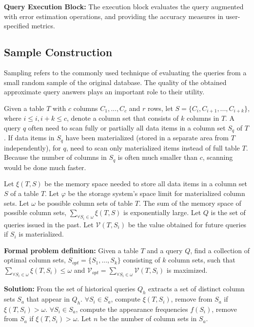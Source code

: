 \documentclass{sig-alternate-05-2015}
\begin{document}
\noindent
\textbf{Query Execution Block:} 
The execution block evaluates the query augmented with error estimation operations, and providing the accuracy measures in user-specified metrics. 

\subsection{Sample Construction}
Sampling refers to the commonly used technique of evaluating the queries from a small random sample of the original database. The quality of the obtained approximate query answers plays an important role to their utility.

Given a table $T$ with $c$ columns $C_1, ..., C_c$ and $r$ rows, let $S=\{C_i, C_{i+1}, ..., C_{i+k}\}$, where $ i \leq i, i+k \leq c$, denote a column set that consists of $k$ columns in $T$. A query $q$ often need to scan fully or partially all data items in a column set $S_q$ of $T$. If data items in $S_q$ have been materialized (stored in a separate area from $T$ independently), for $q$, need to scan only materialized items instead of full table $T$. Because the number of columns in $S_q$ is often much smaller than $c$, scanning would be done much faster.

Let $\xi(T, S)$ be the memory space needed to store all data items in a column set $S$ of a table $T$.
Let $\varphi$ be the storage system's space limit for materialized column sets.
Let $\omega$ be possible column sets of table $T$. 
The sum of the memory space of possible column sets, $\sum_{\forall S_i \in \omega} \xi(T, S)$ is exponentially large.
Let $Q$ is the set of queries issued in the past.
Let $\mathcal{V}(T, S_i)$ be the value obtained for future queries if $S_i$ is materialized.

\noindent
\textbf{Formal problem definition:}  Given a table $T$ and a query $Q$, find a collection of optimal column sets, $S_{opt} = \{S_1, ..., S_k\}$ consisting of $k$ column sets, such that $\sum_{\forall S_i \in \omega} \xi(T, S_i) \leq \omega $ and $\mathcal{V}_{opt} = \sum_{\forall S_i \in \omega} \mathcal{V}(T, S_i) $ is maximized.

\noindent
\textbf{Solution:}
From the set of historical queries $Q_h$ extracts a set of distinct column sets $S_{a}$ that appear in $Q_h$.
$\forall S_i \in S_{a}$, compute $\xi(T, S_i)$, remove from $S_{a}$ if $\xi(T, S_i) > \omega$.
$\forall S_i \in S_{a}$, compute the appearance frequencies $f(S_i)$, remove from $S_{a}$ if $\xi(T, S_i) > \omega$.
Let $n$ be the number of column sets in $S_a$.
\end{document}
